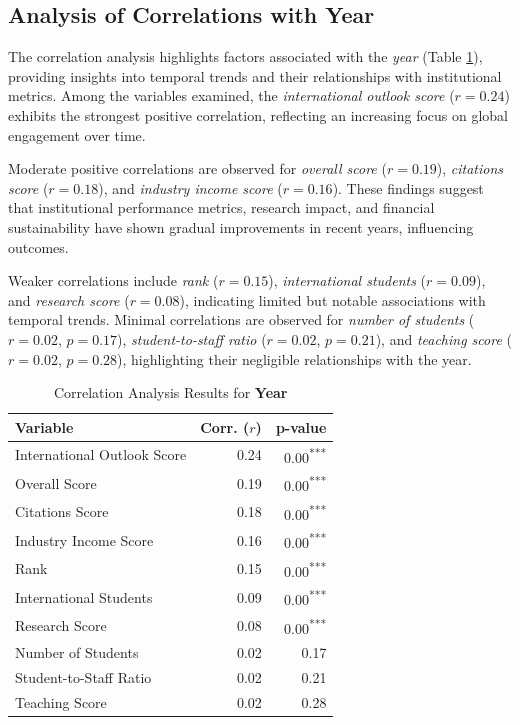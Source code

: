 \documentclass[sigconf]{acmart}
\begin{document}
\subsection{Analysis of Correlations with Year}

The correlation analysis highlights factors associated with the \textit{year} (Table \ref{tab:correlation_year}), providing insights into temporal trends and their relationships with institutional metrics. Among the variables examined, the \textit{international outlook score} ($r = 0.24$) exhibits the strongest positive correlation, reflecting an increasing focus on global engagement over time.

Moderate positive correlations are observed for \textit{overall score} ($r = 0.19$), \textit{citations score} ($r = 0.18$), and \textit{industry income score} ($r = 0.16$). These findings suggest that institutional performance metrics, research impact, and financial sustainability have shown gradual improvements in recent years, influencing outcomes.

Weaker correlations include \textit{rank} ($r = 0.15$), \textit{international students} ($r = 0.09$), and \textit{research score} ($r = 0.08$), indicating limited but notable associations with temporal trends. Minimal correlations are observed for \textit{number of students} ($r = 0.02$, $p = 0.17$), \textit{student-to-staff ratio} ($r = 0.02$, $p = 0.21$), and \textit{teaching score} ($r = 0.02$, $p = 0.28$), highlighting their negligible relationships with the year.

\begin{table}[h!]
	\centering
	\caption{Correlation Analysis Results for \textbf{Year}}
	\label{tab:correlation_year}
	\begin{tabular}{|l|r|r|}
		\hline
		\textbf{Variable} & \textbf{Corr. ($r$)} & \textbf{p-value} \\
		\hline
		International Outlook Score & 0.24 & 0.00\textsuperscript{***} \\
		Overall Score & 0.19 & 0.00\textsuperscript{***} \\
		Citations Score & 0.18 & 0.00\textsuperscript{***} \\
		Industry Income Score & 0.16 & 0.00\textsuperscript{***} \\
		Rank & 0.15 & 0.00\textsuperscript{***} \\
		International Students & 0.09 & 0.00\textsuperscript{***} \\
		Research Score & 0.08 & 0.00\textsuperscript{***} \\
		Number of Students & 0.02 & 0.17 \\
		Student-to-Staff Ratio & 0.02 & 0.21 \\
		Teaching Score & 0.02 & 0.28 \\
		\hline
	\end{tabular}
\end{table}
\end{document}
